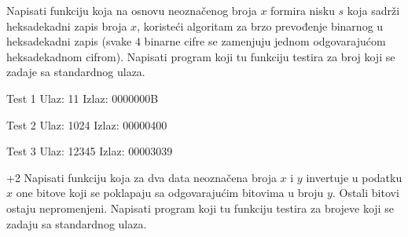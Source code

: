 \begin{Exercise}[label=004]
\begin{Exercise}[label=210]
  Napisati funkciju koja na osnovu neoznačenog broja $x$
  formira nisku $s$ koja sadrži heksadekadni zapis broja
  $x$, koristeći algoritam za brzo prevođenje binarnog u
  heksadekadni zapis (svake $4$ binarne cifre se zamenjuju jednom
  odgovarajućom heksadekadnom cifrom).  Napisati program koji tu
  funkciju testira za broj koji se zadaje sa standardnog ulaza.

\begin{minitest}
\begin{test}{Test 1}
Ulaz:   11             
Izlaz:  0000000B      
\end{test}
\end{minitest}
\begin{minitest}
\begin{test}{Test 2}
Ulaz:  1024        
Izlaz: 00000400  
\end{test}
\end{minitest}
\begin{minitest}
\begin{test}{Test 3}
Ulaz:  12345
Izlaz: 00003039
\end{test}
\end{minitest}

\end{Exercise}
\begin{Answer}[ref=210]
\end{Answer}


\begin{Exercise}[label=211]\marker+{2}
  Napisati funkciju koja za dva data neoznačena broja $x$
  i $y$ invertuje u podatku $x$ one bitove koji se poklapaju
  sa odgovarajućim bitovima u broju $y$. Ostali bitovi ostaju
  nepromenjeni.  Napisati program koji tu funkciju testira za brojeve
  koji se zadaju sa standardnog ulaza.
  

\end{Exercise}
\end{Exercise}
